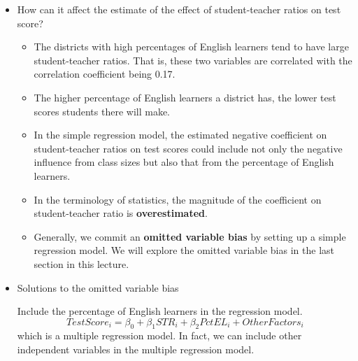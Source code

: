 \documentclass[a4paper,11pt]{article}
\begin{document}
\begin{itemize}
\item How can it affect the estimate of the effect of student-teacher ratios on test score?
\label{sec:orgd19aaa0}

\begin{itemize}
\item The districts with high percentages of English learners tend to have
large student-teacher ratios. That is, these two variables are
correlated with the correlation coefficient being 0.17.
\item The higher percentage of English learners a district has, the lower
test scores students there will make.
\item In the simple regression model, the estimated negative coefficient on
student-teacher ratios on test scores could include not only the
negative influence from class sizes but also that from the
percentage of English learners.
\item In the terminology of statistics, the magnitude of the coefficient
on student-teacher ratio is \textbf{overestimated}.
\item Generally, we commit an \textbf{omitted variable bias} by setting up a simple
regression model. We will explore the omitted variable bias in the
last section in this lecture.
\end{itemize}

\item Solutions to the omitted variable bias
\label{sec:org79495ea}

Include the percentage of English learners in the regression model.
\[ TestScore_i = \beta_0 + \beta_1 STR_i + \beta_2 PctEL_i + OtherFactors_i \]
which is a multiple regression model. In fact, we can include other independent
variables in the multiple regression model.
\end{itemize}
\end{document}
